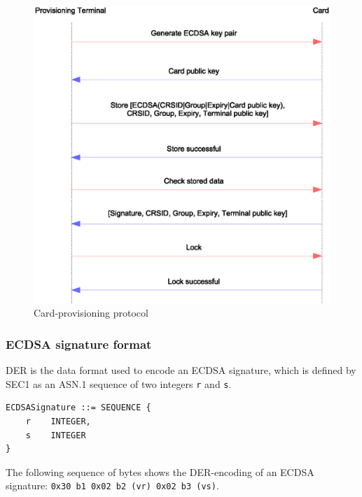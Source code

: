 \documentclass[12pt,a4paper,twoside,openright]{report}
\begin{document}
\begin{figure}[tbh]
\centerline{\includegraphics[scale=0.8]{figures/provisioningprotocol.eps}}
\caption{Card-provisioning protocol}
\label{provisioningprotocol}
\end{figure}

\subsubsection{ECDSA signature format}

DER is the data format used to encode an ECDSA signature, which is defined by SEC1 as an ASN.1 sequence of two integers \texttt{r} and \texttt{s}.

\begin{lstlisting}[caption={ASN.1 structure of an ECDSA signature},captionpos=b]
ECDSASignature ::= SEQUENCE {
    r    INTEGER,
    s    INTEGER
}
\end{lstlisting}

\noindent
The following sequence of bytes shows the DER-encoding of an ECDSA signature: \texttt{0x30 b1 0x02 b2 (vr) 0x02 b3 (vs)}.
\end{document}
